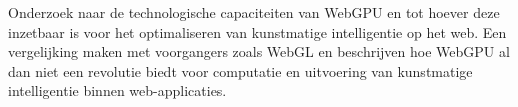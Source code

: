 Onderzoek naar de technologische capaciteiten van WebGPU en tot hoever deze inzetbaar is voor het optimaliseren van kunstmatige intelligentie op het web. Een vergelijking maken met voorgangers zoals WebGL en beschrijven hoe WebGPU al dan niet een revolutie biedt voor computatie en uitvoering van kunstmatige intelligentie binnen web-applicaties.

\section{}%
\label{sec:opzet-bachelorproef}






